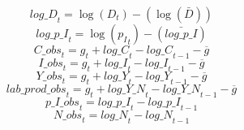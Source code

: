 \begin{dmath}
{log\_D}_{t}=\log\left({{D}}_{t}\right)-(\log\left(\bar{{D}}\right))
\end{dmath}
\begin{dmath}
{log\_p\_I}_{t}=\log\left({{p_I}}_{t}\right)-(\bar{log\_p\_I})
\end{dmath}
\begin{dmath}
{C\_obs}_{t}={{g}}_{t}+{log\_C}_{t}-{log\_C}_{t-1}-{{\overline{g}}}
\end{dmath}
\begin{dmath}
{I\_obs}_{t}={{g}}_{t}+{log\_I}_{t}-{log\_I}_{t-1}-{{\overline{g}}}
\end{dmath}
\begin{dmath}
{Y\_obs}_{t}={{g}}_{t}+{log\_Y}_{t}-{log\_Y}_{t-1}-{{\overline{g}}}
\end{dmath}
\begin{dmath}
{lab\_prod\_obs}_{t}={{g}}_{t}+{log\_Y\_N}_{t}-{log\_Y\_N}_{t-1}-{{\overline{g}}}
\end{dmath}
\begin{dmath}
{p\_I\_obs}_{t}={log\_p\_I}_{t}-{log\_p\_I}_{t-1}
\end{dmath}
\begin{dmath}
{N\_obs}_{t}={log\_N}_{t}-{log\_N}_{t-1}
\end{dmath}

